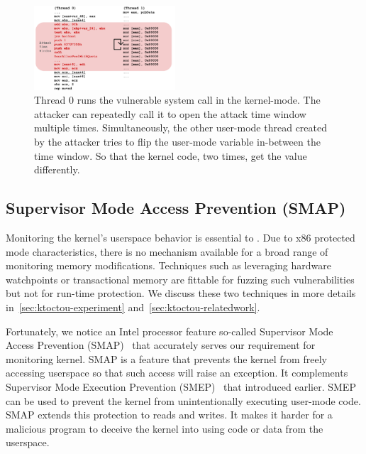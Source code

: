 \begin{figure}[ht]
  \includegraphics[width=0.47\textwidth]{figures/toctouasm3}
  \centering
  \caption{Thread 0 runs the vulnerable system call in the kernel-mode. The attacker can repeatedly call it to open the attack time window multiple times. Simultaneously, the other user-mode thread created by the attacker tries to flip the user-mode variable in-between the time window. So that the kernel code, two times, get the value differently.}
  \label{fig:toctouasm}
\end{figure}



\subsection{Supervisor Mode Access Prevention (SMAP)}

Monitoring the kernel's userspace behavior is essential to \name. Due to x86 protected mode characteristics, there is no mechanism available for a broad range of monitoring memory modifications. Techniques such as leveraging hardware watchpoints or transactional memory are fittable for fuzzing such vulnerabilities but not for run-time protection. We discuss these two techniques in more details in~\autoref{sec:ktoctou-experiment} and~\autoref{sec:ktoctou-relatedwork}.

Fortunately, we notice an Intel processor feature so-called Supervisor Mode Access Prevention (SMAP)~\cite{corbet2012supervisorsmap} that accurately serves our requirement for monitoring kernel.
SMAP is a feature that prevents the kernel from freely accessing userspace so that such access will raise an exception. It complements Supervisor Mode Execution Prevention (SMEP)~\cite{fischer2011supervisor} that introduced earlier. SMEP can be used to prevent the kernel from unintentionally executing user-mode code. SMAP extends this protection to reads and writes. It makes it harder for a malicious program to deceive the kernel into using code or data from the userspace.

